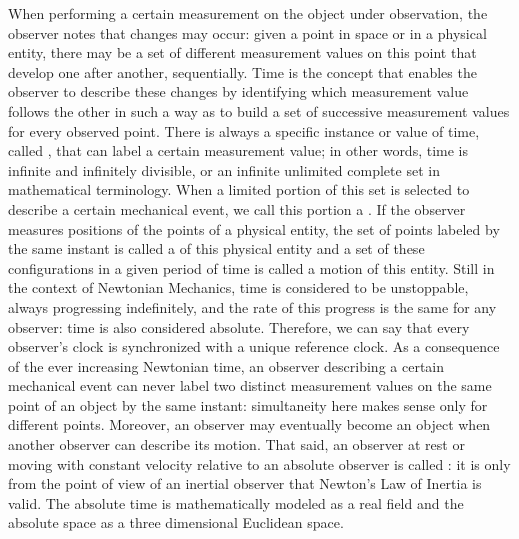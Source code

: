 When performing a certain measurement on the object under observation, the observer notes that changes may occur: given a point in space or in a physical entity, there may be a set of different measurement values on this point that develop one after another, sequentially. Time is the concept that enables the observer to describe these changes by identifying which measurement value follows the other in such a way as to build a set of successive measurement values for every observed point.  There is always a specific instance or value of time, called , that can label a certain measurement value; in other words, time is infinite and infinitely divisible, or an infinite unlimited complete set in mathematical terminology. When a limited portion of this set is selected to describe a certain mechanical event, we call this portion a . If the observer measures positions of the points of a physical entity, the set of points labeled by the same instant is called a  of this physical entity and a set of these configurations in a given period of time is called a motion of this entity. Still in the context of Newtonian Mechanics, time is considered to be unstoppable, always progressing indefinitely, and the rate of this progress is the same for any observer: time is also considered absolute. Therefore, we can say that every observer's clock is synchronized with a unique reference clock. As a consequence of the ever increasing Newtonian time, an observer describing a certain mechanical event can never label two distinct measurement values on the same point of an object by the same instant: simultaneity here makes sense only for different points. Moreover, an observer may eventually become an object when another observer can describe its motion. That said, an observer at rest or moving with constant velocity relative to an absolute observer is called : it is only from the point of view of an inertial observer that Newton's Law of Inertia is valid. The absolute time is mathematically modeled as a real field and the absolute space as a three dimensional Euclidean space.   


